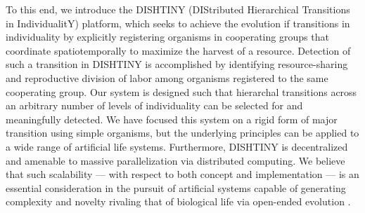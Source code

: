 To this end, we introduce the DISHTINY (DIStributed Hierarchical Transitions in IndividualitY) platform, which seeks to achieve the evolution if transitions in individuality by explicitly registering organisms in cooperating groups that coordinate spatiotemporally to maximize the harvest of a resource.
Detection of such a transition in DISHTINY is accomplished by identifying resource-sharing and reproductive division of labor among organisms registered to the same cooperating group.
Our system is designed such that hierarchal transitions across an arbitrary number of levels of individuality can be selected for and meaningfully detected.
We have focused this system on a rigid form of major transition using simple organisms, but the underlying principles can be applied to a wide range of artificial life systems.
Furthermore, DISHTINY is decentralized and amenable to massive parallelization via distributed computing.
We believe that such scalability --- with respect to both concept and implementation --- is an essential consideration in the pursuit of artificial systems capable of generating complexity and novelty rivaling that of biological life via open-ended evolution \citep{ackley2011pursue, ackley2016indefinite}.

